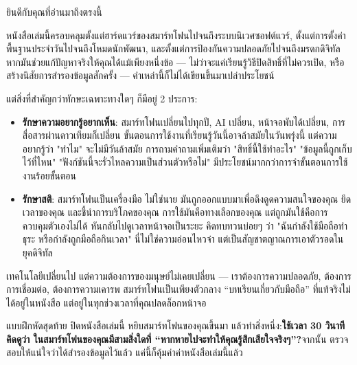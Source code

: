 
ยินดีกับคุณที่อ่านมาถึงตรงนี้

หนังสือเล่มนี้ครอบคลุมตั้งแต่ฮาร์ดแวร์ของสมาร์ทโฟนไปจนถึงระบบนิเวศซอฟต์แวร์, ตั้งแต่การตั้งค่าพื้นฐานประจำวันไปจนถึงโหมดนักพัฒนา, และตั้งแต่การป้องกันความปลอดภัยไปจนถึงมรดกดิจิทัล หากมันช่วยแก้ปัญหาจริงให้คุณได้แม้เพียงหนึ่งข้อ — ไม่ว่าจะแค่เรียนรู้วิธีปิดสิทธิ์ที่ไม่ควรเปิด, หรือสร้างนิสัยการสำรองข้อมูลสักครั้ง — คำเหล่านี้ก็ไม่ได้เขียนขึ้นมาเปล่าประโยชน์

แต่สิ่งที่สำคัญกว่าทักษะเฉพาะทางใดๆ ก็มีอยู่ 2 ประการ:

\begin{itemize}
  \item \textbf{รักษาความอยากรู้อยากเห็น}: สมาร์ทโฟนเปลี่ยนไปทุกปี, AI เปลี่ยน, หน้าจอพับได้เปลี่ยน, การสื่อสารผ่านดาวเทียมก็เปลี่ยน ขั้นตอนการใช้งานที่เรียนรู้วันนี้อาจล้าสมัยในวันพรุ่งนี้ แต่ความอยากรู้ว่า "ทำไม" จะไม่มีวันล้าสมัย การถามคำถามเพิ่มเติมว่า "สิทธิ์นี้ใช้ทำอะไร" "ข้อมูลนี้ถูกเก็บไว้ที่ไหน" "ฟังก์ชันนี้จะรั่วไหลความเป็นส่วนตัวหรือไม่" มีประโยชน์มากกว่าการจำขั้นตอนการใช้งานร้อยขั้นตอน
  \item \textbf{รักษาสติ}: สมาร์ทโฟนเป็นเครื่องมือ ไม่ใช่นาย มันถูกออกแบบมาเพื่อดึงดูดความสนใจของคุณ ยึดเวลาของคุณ และชี้นำการบริโภคของคุณ การใช้มันคือทางเลือกของคุณ แต่ถูกมันใช้คือการควบคุมตัวเองไม่ได้ หันกลับไปดูเวลาหน้าจอเป็นระยะ คิดทบทวนบ่อยๆ ว่า "ฉันกำลังใช้มือถือทำธุระ หรือกำลังถูกมือถือกินเวลา" นี่ไม่ใช่ความอ่อนไหวจ๋า แต่เป็นสัญชาตญาณการเอาตัวรอดในยุคดิจิทัล
\end{itemize}

เทคโนโลยีเปลี่ยนไป แต่ความต้องการของมนุษย์ไม่เคยเปลี่ยน — เราต้องการความปลอดภัย, ต้องการการเชื่อมต่อ, ต้องการความเคารพ สมาร์ทโฟนเป็นเพียงตัวกลาง “บทเรียนเกี่ยวกับมือถือ” ที่แท้จริงไม่ได้อยู่ในหนังสือ แต่อยู่ในทุกช่วงเวลาที่คุณปลดล็อกหน้าจอ

\begin{tcbpractice}{แบบฝึกหัดสุดท้าย}
ปิดหนังสือเล่มนี้ หยิบสมาร์ทโฟนของคุณขึ้นมา แล้วทำสิ่งหนึ่ง:\textbf{ใช้เวลา 30 วินาทีคิดดูว่า ในสมาร์ทโฟนของคุณมีสามสิ่งใดที่ “หากหายไปจะทำให้คุณรู้สึกเสียใจจริงๆ”?}จากนั้น ตรวจสอบให้แน่ใจว่าได้สำรองข้อมูลไว้แล้ว แค่นี้ก็คุ้มค่าค่าหนังสือเล่มนี้แล้ว

\end{tcbpractice}
